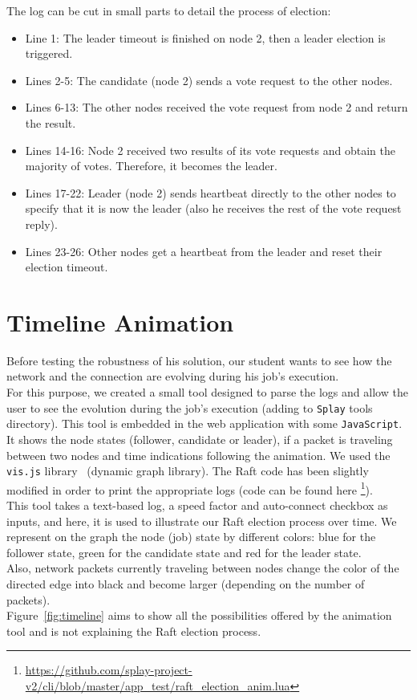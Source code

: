\documentclass{eplmastersthesis}
\begin{document}
        The log can be cut in small parts to detail the process of election:
        \begin{itemize}
          \item Line 1: The leader timeout is finished on node 2, then a leader election is triggered.
          \item Lines 2-5: The candidate (node 2) sends a vote request to the other nodes.
          \item Lines 6-13: The other nodes received the vote request from node 2 and return the result.
          \item Lines 14-16: Node 2 received two results of its vote requests and obtain the majority of votes.
          Therefore, it becomes the leader.
          \item Lines 17-22: Leader (node 2) sends heartbeat directly to the other nodes to specify that it is now the leader
          (also he receives the rest of the vote request reply).
          \item Lines 23-26: Other nodes get a heartbeat from the leader and reset their election timeout.
        \end{itemize}

    \section{Timeline Animation}

      Before testing the robustness of his solution, our student wants to
      see how the network and the connection are evolving during his job's
      execution.\\
      For this purpose, we created a small tool designed to parse the
      logs and allow the user to see the evolution during the job's
      execution (adding to \texttt{Splay} tools directory).
      This tool is embedded in the web application with some
      \texttt{JavaScript}. It shows the node states (follower, candidate or leader),
      if a packet is traveling between two nodes and time
      indications following the animation. We used the \texttt{vis.js} library~\cite{VisJS}
      (dynamic graph library). The Raft code has been slightly
      modified in order to print the appropriate logs (code can be found here
      \footnote{\url{https://github.com/splay-project-v2/cli/blob/master/app_test/raft_election_anim.lua}}).\\

      This tool takes a text-based log, a speed factor and auto-connect
      checkbox as inputs, and here, it is used to illustrate our Raft election
      process over time. We represent on the graph the node (job)
      state by different colors: blue for the follower state,
      green for the candidate state and red for the leader state.\\
      Also, network packets currently traveling between nodes change the color
      of the directed edge into black and become larger (depending on the
      number of packets).\\
      Figure~\ref{fig:timeline} aims to show all the possibilities offered by the animation
      tool and is not explaining the Raft election process.
\end{document}
